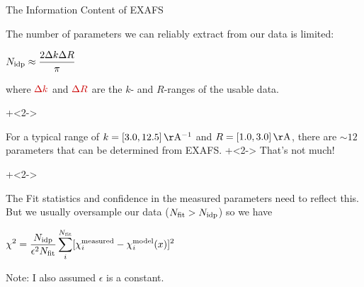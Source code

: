 \begin{slide}{The Information Content of EXAFS}

\begin{cenpage}{105mm}
    The number of parameters we can reliably extract from our data is limited:
    \vspace{1mm}


    \begin{postitbox}{26mm}
      $\displaystyle  N_{\rm idp} \approx { \frac{2 \Delta k \Delta R}{\pi}}  $
    \end{postitbox}

    \vmm

    where $\Red{ \Delta k}$ and $\Red{ \Delta R}$ are the $k$- and
    $R$-ranges of the usable data.

    \onslide+<2->
    \vmm\vmm

    For a typical range of $k = [3.0, 12.5] \rm\,\AA^{-1}$ and $R = [1.0,
    3.0] \rm\,\AA$, there are $\sim 12$ parameters that can be determined
    from EXAFS.      \onslide+<2-> That's not much!

    \onslide+<2->
    \vmm\vmm

    The Fit statistics and confidence in the measured parameters need to
    reflect this.  But we usually oversample our data ($N_{\rm fit} >
    N_{\rm idp} $) so we have

    \begin{postitbox}{56mm}
      $ \displaystyle
      \chi^2  =  \frac{ N_{\rm idp}}{\epsilon^2 N_{\rm fit}}
      \sum_i^{N_{\rm fit}} [\chi_i^{\rm measured} - \chi_i^{\rm model}({x})]^2
      $
    \end{postitbox}

    Note: I also assumed $\epsilon$ is a constant.

\vfill
\end{cenpage}
\end{slide}


